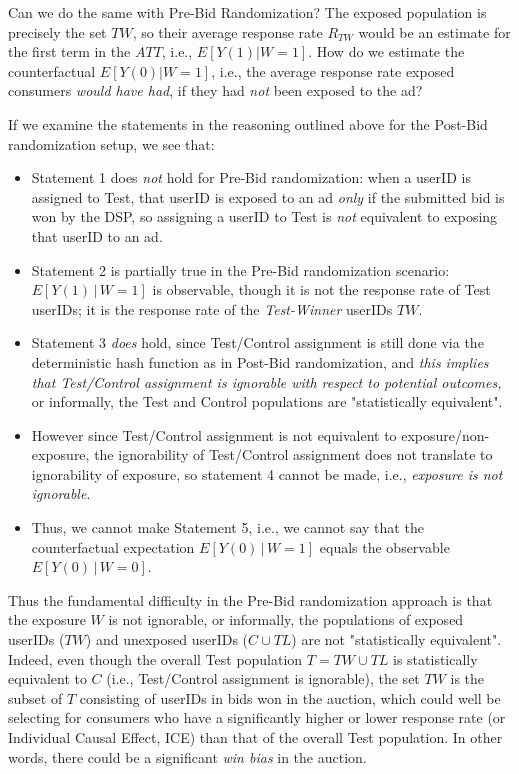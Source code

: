 \documentclass[11pt,a4paper]{article}
\theoremstyle{definition}
\theoremstyle{remark}
\theoremstyle{definition}
\theoremstyle{definition}
\theoremstyle{definition}
\theoremstyle{definition}
\theoremstyle{definition}
\theoremstyle{definition}
\begin{document}
Can we do the same with Pre-Bid Randomization? The exposed population is precisely the set $TW$, so their average response rate $R_{TW}$ would be an estimate for the first term in the $ATT$, i.e., $E[ Y(1) | W=1]$. How do we estimate the counterfactual $E[Y(0) | W=1]$, i.e., the average response rate exposed consumers {\em would have had}, if they had {\em not} been exposed to the ad? 

If we examine the statements in the reasoning outlined above for the Post-Bid randomization setup, we see that:
\begin{itemize}
	\item Statement 1 does \textit{not} hold for Pre-Bid randomization: when a userID is assigned to Test, that userID is exposed to an ad \textit{only} if the submitted bid is won by the DSP, so assigning a userID to Test is \textit{not} equivalent to exposing that userID to an ad.
	\item Statement 2 is partially true in the Pre-Bid randomization scenario: $E[Y(1) \,|\, W=1]$ is observable, though it is not the response rate of Test userIDs; it is the response rate of the \textit{Test-Winner} userIDs $TW$.
	\item Statement 3 \textit{does} hold, since Test/Control assignment is still done via the deterministic hash function as in Post-Bid randomization, and \textit{this implies that Test/Control assignment is ignorable with respect to potential outcomes,} or informally, the Test and Control populations are "statistically equivalent".
	\item However since Test/Control assignment is not equivalent to exposure/non-exposure, the ignorability of Test/Control assignment does not translate to ignorability of exposure, so statement 4 cannot be made, i.e., \textit{exposure is not ignorable}.
	\item Thus, we cannot make Statement 5, i.e., we cannot say that the counterfactual expectation $E[Y(0) \,|\, W=1]$ equals the observable $E[Y(0) \,|\,W=0]$.
\end{itemize}

Thus the fundamental difficulty in the Pre-Bid randomization approach is that the exposure $W$ is not ignorable, or informally, the populations of exposed userIDs ($TW$) and unexposed userIDs ($C \cup TL$) are not "statistically equivalent". Indeed, even though the overall Test population $T = TW \cup TL$  is statistically equivalent to $C$ (i.e., Test/Control assignment is ignorable), the set $TW$ is the subset of $T$ consisting of userIDs in bids won in the auction, which could well be selecting for consumers who have a significantly higher or lower response rate (or Individual Causal Effect, ICE) than that of the overall Test population. In other words, there could be a significant {\em win bias} in the auction.
\end{document}
